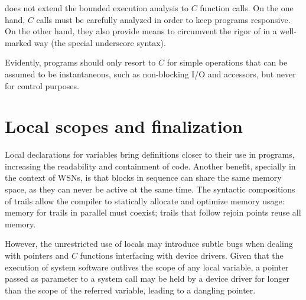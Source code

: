 \CEU does not extend the bounded execution analysis to $C$ function calls. 
On the one hand, $C$ calls must be carefully analyzed in order to keep programs 
responsive.
On the other hand, they also provide means to circumvent the rigor of \CEU in a 
well-marked way (the special underscore syntax).
%

%
Evidently, programs should only resort to $C$ for simple operations that can be 
assumed to be instantaneous, such as non-blocking I/O and  
accessors, but never for control purposes.

\section{Local scopes and finalization}
\label{sec.ceu.fins}

Local declarations for variables bring definitions closer to their use in 
programs, increasing the readability and containment of code.
Another benefit, specially in the context of WSNs, is that blocks in sequence 
can share the same memory space, as they can never be active at the same time.
%
The syntactic compositions of trails allow the \CEU compiler to statically 
allocate and optimize memory usage:
memory for trails in parallel must coexist;
trails that follow rejoin points reuse all memory.

However, the unrestricted use of locals may introduce subtle bugs when dealing 
with pointers and $C$ functions interfacing with device drivers.
Given that the execution of system software outlives the scope of any local 
variable, a pointer passed as parameter to a system call may be held by a 
device driver
for longer than the scope of the referred variable, leading to a dangling 
pointer.

